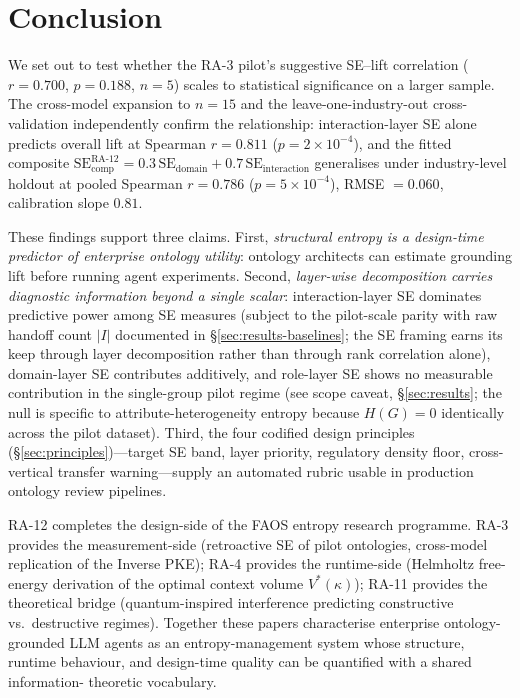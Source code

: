 \documentclass[11pt,a4paper]{article}
\newcommand{\faos}{\textsc{FAOS}}
\newcommand{\se}{\mathrm{SE}}
\newcommand{\sedom}{\se_{\text{domain}}}
\newcommand{\seint}{\se_{\text{interaction}}}
\newcommand{\secomp}{\se_{\text{comp}}}
\begin{document}
\section{Conclusion}
\label{sec:conclusion}

We set out to test whether the RA-3 pilot's suggestive SE--lift
correlation ($r = 0.700$, $p = 0.188$, $n = 5$) scales to statistical
significance on a larger sample. The cross-model expansion
to $n = 15$ and the leave-one-industry-out cross-validation
independently confirm the relationship: interaction-layer SE alone
predicts overall lift at Spearman $r = 0.811$ ($p = 2 \times 10^{-4}$),
and the fitted composite $\secomp^{\text{RA-12}} = 0.3\,\sedom +
0.7\,\seint$ generalises under industry-level holdout at pooled
Spearman $r = 0.786$ ($p = 5 \times 10^{-4}$), RMSE $= 0.060$,
calibration slope $0.81$.

These findings support three claims. First, \emph{structural entropy is
a design-time predictor of enterprise ontology utility}: ontology
architects can estimate grounding lift before running agent experiments.
Second, \emph{layer-wise decomposition carries diagnostic information
beyond a single scalar}: interaction-layer SE dominates predictive
power among SE measures (subject to the pilot-scale parity with raw
handoff count $|I|$ documented in \S\ref{sec:results-baselines}; the
SE framing earns its keep through layer decomposition rather than
through rank correlation alone), domain-layer SE contributes
additively, and role-layer SE shows no measurable contribution in
the single-group pilot regime (see scope caveat, \S\ref{sec:results};
the null is specific to attribute-heterogeneity entropy because
$H(G) = 0$ identically across the pilot dataset). Third, the four codified design principles
(\S\ref{sec:principles})---target SE band, layer priority, regulatory
density floor, cross-vertical transfer warning---supply an automated
rubric usable in production ontology review pipelines.

RA-12 completes the design-side of the \faos{} entropy research
programme. RA-3 \citep{luong2026neurosymbolic} provides the
measurement-side (retroactive SE of pilot ontologies, cross-model
replication of the Inverse PKE); RA-4 \citep{luong2026context}
provides the runtime-side (Helmholtz free-energy derivation of the
optimal context volume $V^*(\kappa)$); RA-11 \citep{luong2026quantum}
provides the theoretical bridge (quantum-inspired interference
predicting constructive vs.\ destructive regimes). Together these
papers characterise enterprise ontology-grounded LLM agents as an
entropy-management system whose structure, runtime behaviour, and
design-time quality can be quantified with a shared information-%
theoretic vocabulary.
\end{document}
